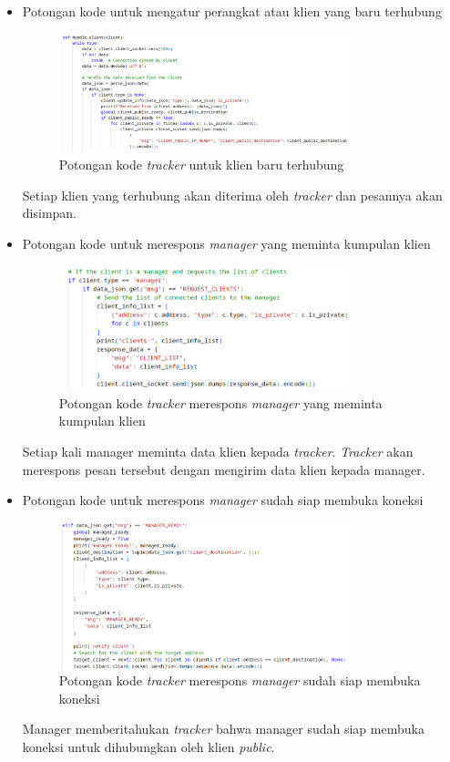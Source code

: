 \begin{itemize}
	\item{Potongan kode untuk mengatur perangkat atau klien yang baru terhubung}
	\begin{figure}[H]
		\centering{}
		\includegraphics[width=0.8\textwidth]{gambar/kode/potongan_tracker_01}
		\caption{Potongan kode \emph{tracker} untuk klien baru terhubung}
	\end{figure}
	Setiap klien yang terhubung akan diterima oleh \emph{tracker} dan pesannya akan disimpan.

	\clearpage
	\item{Potongan kode untuk merespons \emph{manager} yang meminta kumpulan klien}
	\begin{figure}[H]
		\centering{}
		\includegraphics[width=0.8\textwidth]{gambar/kode/potongan_tracker_02}
		\caption{Potongan kode \emph{tracker} merespons \emph{manager} yang meminta kumpulan klien } 
	\end{figure}
	Setiap kali manager meminta data klien kepada \emph{tracker}. \emph{Tracker} akan merespons pesan tersebut dengan mengirim data klien kepada manager.

	\item{Potongan kode untuk merespons \emph{manager} sudah siap membuka koneksi}
	\begin{figure}[H]
		\centering{}
		\includegraphics[width=0.8\textwidth]{gambar/kode/potongan_tracker_03}
		\caption{Potongan kode \emph{tracker} merespons \emph{manager} sudah siap membuka koneksi}
	\end{figure}
	Manager memberitahukan \emph{tracker} bahwa manager sudah siap membuka koneksi untuk dihubungkan oleh klien \emph{public}. 


\end{itemize}
